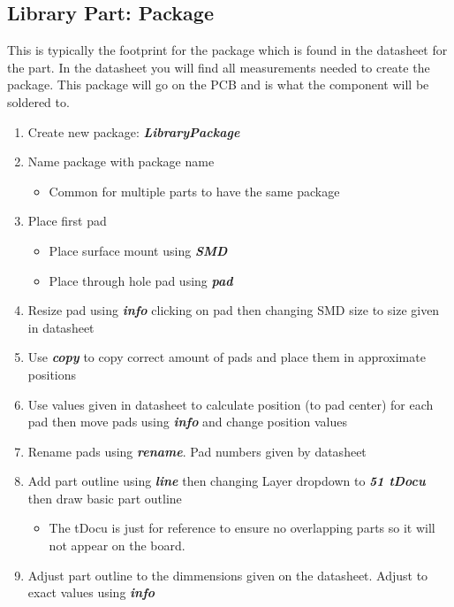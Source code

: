 \documentclass{article}
\begin{document}
\subsection{Library Part: Package}
This is typically the footprint for the package which is found in the datasheet
for the part. In the datasheet you will find all measurements needed to create
the package. This package will go on the PCB and is what the component will be
soldered to.
\begin{enumerate}
    \item Create new package: \textit{\textbf{Library\textrightarrow Package}}
    \item Name package with package name
    \begin{itemize}
        \item Common for multiple parts to have the same package
    \end{itemize}
    \item Place first pad
    \begin{itemize}
        \item Place surface mount using \textit{\textbf{SMD}}
        \item Place through hole pad using \textit{\textbf{pad}}
    \end{itemize}
    \item Resize pad using \textit{\textbf{info}} clicking on pad then changing
    SMD size to size given in datasheet
    \item Use \textit{\textbf{copy}} to copy correct amount of pads and place
    them in approximate positions
    \item Use values given in datasheet to calculate position (to pad center)
    for each pad then move pads using \textit{\textbf{info}} and change
    position values
    \item Rename pads using \textit{\textbf{rename}}. Pad numbers given by
    datasheet
    \item Add part outline using \textit{\textbf{line}} then changing Layer
    dropdown to \textit{\textbf{51 tDocu}} then draw basic part outline
    \begin{itemize}
        \item The tDocu is just for reference to ensure no overlapping parts so
        it will not appear on the board.
    \end{itemize}
    \item Adjust part outline to the dimmensions given on the datasheet. Adjust
    to exact values using \textit{\textbf{info}}

\end{enumerate}
\end{document}
